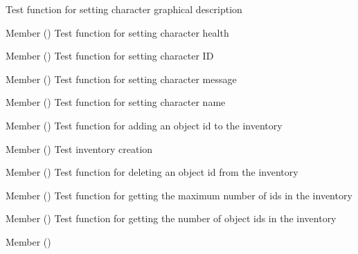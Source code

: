 \begin{DoxyRefList}
%
Test function for setting character graphical description  
\item[Member \doxylink{character__test_8h_afb4339e93579a493cfbf9a5cb756970c}{test1\+\_\+character\+\_\+set\+\_\+health} ()]\label{test__test000023}%
%
Test function for setting character health  
\item[Member \doxylink{character__test_8h_a1c006698dcf0e0cad7e1f0698f9af45d}{test1\+\_\+character\+\_\+set\+\_\+id} ()]\label{test__test000015}%
%
Test function for setting character ID  
\item[Member \doxylink{character__test_8h_a584776b3da77ffca825dd73f03721248}{test1\+\_\+character\+\_\+set\+\_\+message} ()]\label{test__test000028}%
%
Test function for setting character message  
\item[Member \doxylink{character__test_8h_a334203c3ea83a67f7c6e1f992ef199a6}{test1\+\_\+character\+\_\+set\+\_\+name} ()]\label{test__test000017}%
%
Test function for setting character name  
\item[Member \doxylink{inventory__test_8h_afef0a769a2433b3f72edf41de29c09e1}{test1\+\_\+inventory\+\_\+add\+\_\+obj\+\_\+id} ()]\label{test__test000033}%
%
Test function for adding an object id to the inventory  
\item[Member \doxylink{inventory__test_8h_a33638f1a88ae16ab8d6bee00145b82b8}{test1\+\_\+inventory\+\_\+create} ()]\label{test__test000031}%
%
Test inventory creation  
\item[Member \doxylink{inventory__test_8h_a6d914019e684ce00af5cf2632648b684}{test1\+\_\+inventory\+\_\+delete\+\_\+obj\+\_\+id} ()]\label{test__test000035}%
%
Test function for deleting an object id from the inventory  
\item[Member \doxylink{inventory__test_8h_a42b51a5b53baf38bddce941a7703d18a}{test1\+\_\+inventory\+\_\+get\+\_\+max\+\_\+objs} ()]\label{test__test000039}%
%
Test function for getting the maximum number of ids in the inventory  
\item[Member \doxylink{inventory__test_8h_a2c9cb7fd433d11dd4eaa0be778b8c76a}{test1\+\_\+inventory\+\_\+get\+\_\+n\+\_\+objs} ()]\label{test__test000041}%
%
Test function for getting the number of object ids in the inventory  
\item[Member \doxylink{inventory__test_8h_a58ae7b24bbd217edefed7a5c503dc095}{test1\+\_\+inventory\+\_\+get\+\_\+obj\+\_\+ids} ()]\label{test__test000043}%

\end{DoxyRefList}
